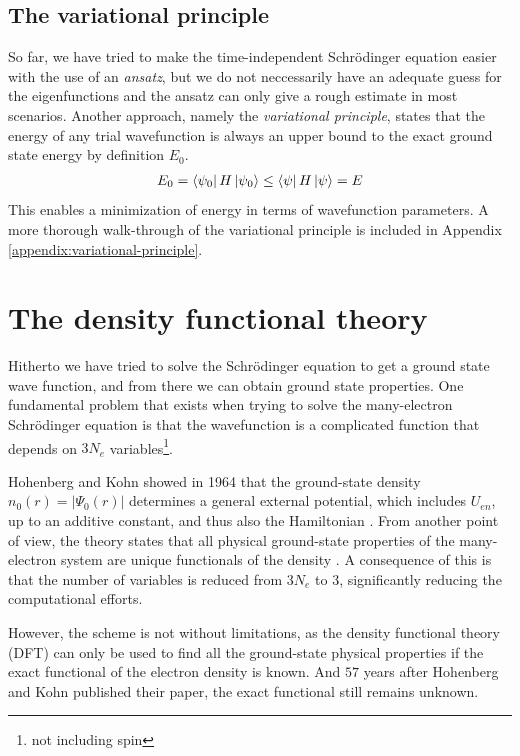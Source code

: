 \subsection{The variational principle}
So far, we have tried to make the time-independent Schrödinger equation easier with the use of an \textit{ansatz}, but we do not neccessarily have an adequate guess for the eigenfunctions and the ansatz can only give a rough estimate in most scenarios. Another approach, namely the \textit{variational principle}, states that the energy of any trial wavefunction is always an upper bound to the exact ground state energy by definition $E_0$.
\begin{align}
  E_0 = \bra{\psi_0 } H \ket{\psi_0} \leq \bra{\psi}H\ket{\psi} = E
\end{align} This enables a minimization of energy in terms of wavefunction parameters. A more thorough walk-through of the variational principle is included in Appendix \ref{appendix:variational-principle}.

\section{The density functional theory}

Hitherto we have tried to solve the Schrödinger equation to get a ground state wave function, and from there we can obtain ground state properties. One fundamental problem that exists when trying to solve the many-electron Schrödinger equation is that the wavefunction is a complicated function that depends on $3N_e$ variables\footnote{not including spin}.

Hohenberg and Kohn \cite{Hohenberg1964} showed in 1964 that the ground-state density $n_0(r) = \lvert \Psi_0 (r)\rvert$ determines a general external potential, which includes $U_{en}$, up to an additive constant, and thus also the Hamiltonian \cite{Toulouse2019}. From another point of view, the theory states that all physical ground-state properties of the many-electron system are unique functionals of the density \cite{Persson2020}. A consequence of this is that the number of variables is reduced from $3N_e$ to $3$, significantly reducing the computational efforts.

However, the scheme is not without limitations, as the density functional theory (DFT) can only be used to find all the ground-state physical properties if the exact functional of the electron density is known. And $57$ years after Hohenberg and Kohn published their paper, the exact functional still remains unknown.


